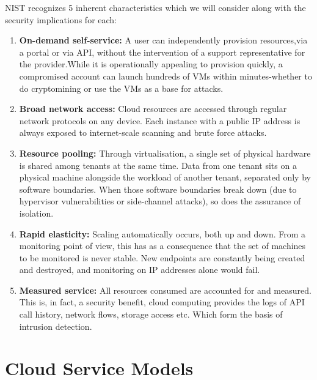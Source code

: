 NIST recognizes 5 inherent characteristics which we will consider along with the security implications for each:

\begin{enumerate}[label=\alph*.]

  \item \textbf{On-demand self-service:} A user can independently provision resources,via a portal or via API, without the intervention of a support representative for the provider.While it is operationally appealing to provision quickly, a compromised account can launch hundreds of VMs within minutes-whether to do cryptomining or use the VMs as a base for attacks.

  \item \textbf{Broad network access:} Cloud resources are accessed through regular network protocols on any device. Each instance with a public IP address is always exposed to internet-scale scanning and brute force attacks.

  \item \textbf{Resource pooling:} Through virtualisation, a single set of physical hardware is shared among tenants at the same time. Data from one tenant sits on a physical machine alongside the workload of another tenant, separated only by software boundaries. When those software boundaries break down (due to hypervisor vulnerabilities or side-channel attacks), so does the assurance of isolation.

  \item \textbf{Rapid elasticity:} Scaling automatically occurs, both up and down.
From a monitoring point of view, this has as a consequence that the set of machines to be monitored is never stable. New endpoints are constantly being created and destroyed, and monitoring on IP addresses alone would fail.

  \item \textbf{Measured service:} All resources consumed are accounted for and measured.
This is, in fact, a security benefit, cloud computing provides the logs of API call history, network flows, storage access etc. Which form the basis of intrusion detection.

\end{enumerate}

\section{Cloud Service Models}
\label{sec:service_models}

